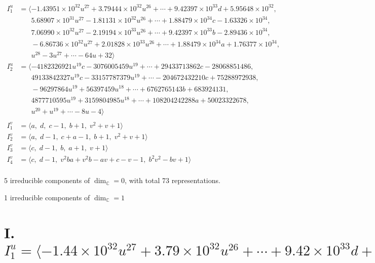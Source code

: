 \documentclass[1p]{elsarticle_modified}
\theoremstyle{definition}
\begin{document}
\begin{align*}
I^u_{1}&=\langle 
-1.43951\times10^{32} u^{27}+3.79444\times10^{32} u^{26}+\cdots+9.42397\times10^{33} d+5.95648\times10^{32},\\
\phantom{I^u_{1}}&\phantom{= \langle  }5.68907\times10^{31} u^{27}-1.81131\times10^{32} u^{26}+\cdots+1.88479\times10^{34} c-1.63326\times10^{34},\\
\phantom{I^u_{1}}&\phantom{= \langle  }7.06990\times10^{32} u^{27}-2.19194\times10^{33} u^{26}+\cdots+9.42397\times10^{33} b-2.89436\times10^{34},\\
\phantom{I^u_{1}}&\phantom{= \langle  }-6.86736\times10^{32} u^{27}+2.01828\times10^{33} u^{26}+\cdots+1.88479\times10^{34} a+1.76377\times10^{34},\\
\phantom{I^u_{1}}&\phantom{= \langle  }u^{28}-3 u^{27}+\cdots-64 u+32\rangle \\
I^u_{2}&=\langle 
-4182326921 u^{19} c-3076005459 u^{19}+\cdots+29433713862 c-28068851486,\\
\phantom{I^u_{2}}&\phantom{= \langle  }49133842327 u^{19} c-33157787379 u^{19}+\cdots-204672432210 c+75288972938,\\
\phantom{I^u_{2}}&\phantom{= \langle  }-96297864 u^{19}+56397459 u^{18}+\cdots+6762765143 b+683924131,\\
\phantom{I^u_{2}}&\phantom{= \langle  }4877710595 u^{19}+3159804985 u^{18}+\cdots+108204242288 a+50023322678,\\
\phantom{I^u_{2}}&\phantom{= \langle  }u^{20}+u^{19}+\cdots-8 u-4\rangle \\
\\
I^v_{1}&=\langle 
a,\;d,\;c-1,\;b+1,\;v^2+v+1\rangle \\
I^v_{2}&=\langle 
a,\;d-1,\;c+a-1,\;b+1,\;v^2+v+1\rangle \\
I^v_{3}&=\langle 
c,\;d-1,\;b,\;a+1,\;v+1\rangle \\
I^v_{4}&=\langle 
c,\;d-1,\;v^2 b a+v^2 b- a v+c- v-1,\;b^2 v^2- b v+1\rangle \\
\end{align*}
\raggedright * 5 irreducible components of $\dim_{\mathbb{C}}=0$, with total 73 representations.\\
\raggedright * 1 irreducible components of $\dim_{\mathbb{C}}=1$ \\
\newpage
\renewcommand{\arraystretch}{1}
\centering \section*{I. $I^u_{1}= \langle -1.44\times10^{32} u^{27}+3.79\times10^{32} u^{26}+\cdots+9.42\times10^{33} d+5.96\times10^{32},\;5.69\times10^{31} u^{27}-1.81\times10^{32} u^{26}+\cdots+1.88\times10^{34} c-1.63\times10^{34},\;7.07\times10^{32} u^{27}-2.19\times10^{33} u^{26}+\cdots+9.42\times10^{33} b-2.89\times10^{34},\;-6.87\times10^{32} u^{27}+2.02\times10^{33} u^{26}+\cdots+1.88\times10^{34} a+1.76\times10^{34},\;u^{28}-3 u^{27}+\cdots-64 u+32 \rangle$}
\end{document}
